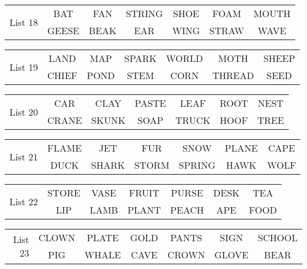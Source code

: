 \documentclass{article}
\begin{document}
\vspace{.1in}
\hspace{.5in}\begin{tabular}{r||c c c c c c }
\multirow{2}{*}{List 18} & BAT & FAN & STRING & SHOE & FOAM & MOUTH\\
\cline{2-7}			& GEESE & BEAK & EAR & WING & STRAW & WAVE\\
\end{tabular}

\vspace{.1in}
\hspace{.5in}\begin{tabular}{r||c c c c c c }
\multirow{2}{*}{List 19} & LAND & MAP & SPARK & WORLD & MOTH & SHEEP\\
\cline{2-7}			& CHIEF & POND & STEM & CORN & THREAD & SEED\\
\end{tabular}

\vspace{.1in}
\hspace{.5in}\begin{tabular}{r||c c c c c c }
\multirow{2}{*}{List 20} & CAR & CLAY & PASTE & LEAF & ROOT & NEST\\
\cline{2-7}			& CRANE & SKUNK & SOAP & TRUCK & HOOF & TREE\\
\end{tabular}

\vspace{.1in}
\hspace{.5in}\begin{tabular}{r||c c c c c c }
\multirow{2}{*}{List 21} & FLAME & JET & FUR & SNOW & PLANE & CAPE\\
\cline{2-7}			& DUCK & SHARK & STORM & SPRING & HAWK & WOLF\\
\end{tabular}

\vspace{.1in}
\hspace{.5in}\begin{tabular}{r||c c c c c c }
\multirow{2}{*}{List 22} & STORE & VASE & FRUIT & PURSE & DESK & TEA\\
\cline{2-7}			& LIP & LAMB & PLANT & PEACH & APE & FOOD\\
\end{tabular}

\vspace{.1in}
\hspace{.5in}\begin{tabular}{r||c c c c c c }
\multirow{2}{*}{List 23} & CLOWN & PLATE & GOLD & PANTS & SIGN & SCHOOL\\
\cline{2-7}			& PIG & WHALE & CAVE & CROWN & GLOVE & BEAR\\
\end{tabular}
\end{document}
